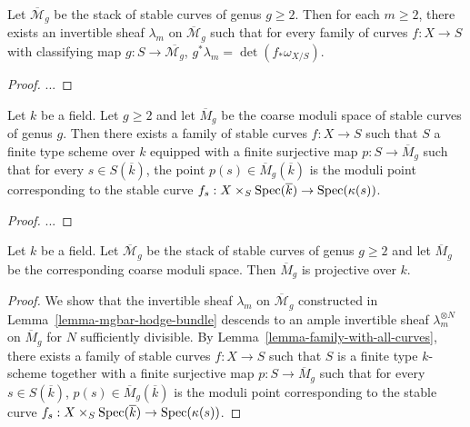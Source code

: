 \begin{lemma}
\label{lemma-mgbar-hodge-bundle}
Let $\overline{\mathcal{M}}_g$ be the stack of stable curves of genus $g \geq 2$.
Then for each $m \geq 2$, there exists an invertible sheaf $\lambda_m$ on
$\overline{\mathcal{M}}_g$ such that for every family of curves $f : X \to S$
with classifying map $g : S \to \overline{\mathcal{M}_g}$,
$g^*\lambda_m = \det(f_*\omega_{X/S})$.
\end{lemma}

\begin{proof}
...
\end{proof}

\begin{lemma}
\label{lemma-family-with-all-curves}
Let $k$ be a field.
Let $g \geq 2$ and let $\overline{M}_g$ be the coarse moduli space of stable
curves of genus $g$.
Then there exists a family of stable curves $f : X \to S$ such that
$S$ a finite type scheme over $k$ equipped with a finite surjective map
$p : S \to \overline{M}_g$ such that for every
$s \in S(\overline k)$, the point $p(s) \in \overline{M}_g(\overline k)$ is
the moduli point corresponding to the stable curve
$f_s : X \times_S \mathop{\rm Spec}(\overline k) \to \mathop{\rm Spec}(\kappa(s))$.
\end{lemma}

\begin{proof}
  ...
\end{proof}

\begin{lemma}
\label{lemma-mgbar-proj-field}
Let $k$ be a field.
Let $\overline{\mathcal{M}}_g$ be the stack of stable curves of genus $g \geq 2$
and let $\overline{M}_g$ be the corresponding coarse moduli space.
Then $\overline{M}_g$ is projective over $k$.
\end{lemma}

\begin{proof}
We show that the invertible sheaf $\lambda_m$ on $\overline{\mathcal{M}}_g$
constructed in Lemma~\ref{lemma-mgbar-hodge-bundle} descends to an ample
invertible sheaf $\lambda_m^{\otimes N}$ on $\overline{M}_g$ for $N$
sufficiently divisible.
By Lemma~\ref{lemma-family-with-all-curves}, there exists a family of stable
curves $f : X \to S$ such that $S$ is a finite type $k$-scheme together with
a finite surjective map $p : S \to \overline{M}_g$ such that for every
$s \in S(\overline k)$, $p(s) \in \overline{M}_g(\overline k)$ is
the moduli point corresponding to the stable curve
$f_s : X \times_S \mathop{\rm Spec}(\overline k) \to \mathop{\rm Spec}(\kappa(s))$.

\end{proof}


